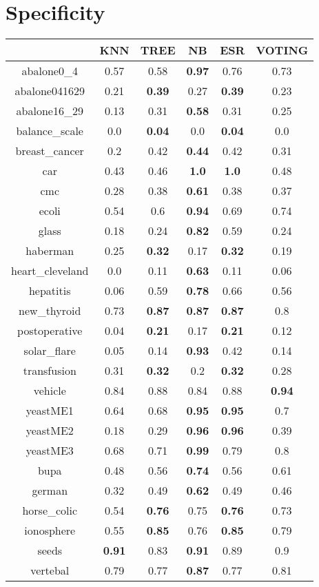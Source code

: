 \documentclass{article}%
\begin{document}
%
\section*{Specificity}%
\begin{tabular}{c|ccccc}%
\hline%
&KNN&TREE&NB&ESR&VOTING\\%
\hline%
abalone0\_4&0.57&0.58&\textbf{0.97}&0.76&0.73\\%
\hline%
abalone041629&0.21&\textbf{0.39}&0.27&\textbf{0.39}&0.23\\%
\hline%
abalone16\_29&0.13&0.31&\textbf{0.58}&0.31&0.25\\%
\hline%
balance\_scale&0.0&\textbf{0.04}&0.0&\textbf{0.04}&0.0\\%
\hline%
breast\_cancer&0.2&0.42&\textbf{0.44}&0.42&0.31\\%
\hline%
car&0.43&0.46&\textbf{1.0}&\textbf{1.0}&0.48\\%
\hline%
cmc&0.28&0.38&\textbf{0.61}&0.38&0.37\\%
\hline%
ecoli&0.54&0.6&\textbf{0.94}&0.69&0.74\\%
\hline%
glass&0.18&0.24&\textbf{0.82}&0.59&0.24\\%
\hline%
haberman&0.25&\textbf{0.32}&0.17&\textbf{0.32}&0.19\\%
\hline%
heart\_cleveland&0.0&0.11&\textbf{0.63}&0.11&0.06\\%
\hline%
hepatitis&0.06&0.59&\textbf{0.78}&0.66&0.56\\%
\hline%
new\_thyroid&0.73&\textbf{0.87}&\textbf{0.87}&\textbf{0.87}&0.8\\%
\hline%
postoperative&0.04&\textbf{0.21}&0.17&\textbf{0.21}&0.12\\%
\hline%
solar\_flare&0.05&0.14&\textbf{0.93}&0.42&0.14\\%
\hline%
transfusion&0.31&\textbf{0.32}&0.2&\textbf{0.32}&0.28\\%
\hline%
vehicle&0.84&0.88&0.84&0.88&\textbf{0.94}\\%
\hline%
yeastME1&0.64&0.68&\textbf{0.95}&\textbf{0.95}&0.7\\%
\hline%
yeastME2&0.18&0.29&\textbf{0.96}&\textbf{0.96}&0.39\\%
\hline%
yeastME3&0.68&0.71&\textbf{0.99}&0.79&0.8\\%
\hline%
bupa&0.48&0.56&\textbf{0.74}&0.56&0.61\\%
\hline%
german&0.32&0.49&\textbf{0.62}&0.49&0.46\\%
\hline%
horse\_colic&0.54&\textbf{0.76}&0.75&\textbf{0.76}&0.73\\%
\hline%
ionosphere&0.55&\textbf{0.85}&0.76&\textbf{0.85}&0.79\\%
\hline%
seeds&\textbf{0.91}&0.83&\textbf{0.91}&0.89&0.9\\%
\hline%
vertebal&0.79&0.77&\textbf{0.87}&0.77&0.81\\%
\hline%
\end{tabular}
\end{document}
